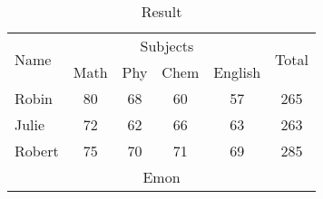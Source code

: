 \documentclass[a4paper]{article}
\begin{document}
\begin{table}[!htb]
    \centering
    \caption{Result}

    \begin{tabular}{|l|c|c|c|c|c|}
        \hline 
        \multirow{2}{*}{Name} & \multicolumn{4}{|c|}{Subjects} & \multirow{2}{*}{Total}\\ 
        \cline{2-5} %
            & Math & Phy & Chem & English & \\ 
        \hline
        \hline Robin & 80 & 68 & 60 & 57 & 265\\
        \hline Julie & 72 & 62 & 66 & 63 & 263\\
        \hline Robert & 75 & 70 & 71 & 69 & 285\\
        \hline \multicolumn{6}{|c|}{\multirow{1}{*}{Emon}}\\
        \hline

        
    \end{tabular}
\end{table}

    
\end{document}
